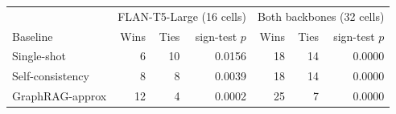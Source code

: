 \begin{tabular}{lrrrrrr}
\toprule
 & \multicolumn{3}{c}{FLAN-T5-Large (16 cells)} & \multicolumn{3}{c}{Both backbones (32 cells)} \\
Baseline & Wins & Ties & sign-test $p$ & Wins & Ties & sign-test $p$ \\
\midrule
Single-shot & 6 & 10 & 0.0156 & 18 & 14 & 0.0000 \\
Self-consistency & 8 & 8 & 0.0039 & 18 & 14 & 0.0000 \\
GraphRAG-approx & 12 & 4 & 0.0002 & 25 & 7 & 0.0000 \\
\bottomrule
\end{tabular}